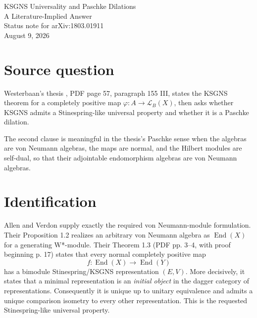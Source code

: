 \documentclass[10pt]{article}
\begin{document}
\begin{center}
{\LARGE KSGNS Universality and Paschke Dilations}\\[0.25em]
{\Large A Literature-Implied Answer}\\[0.55em]
{\large Status note for arXiv:1803.01911}\\[0.25em]
August 9, 2026
\end{center}

\begin{center}
\end{center}

\section*{Source question}

Westerbaan's thesis \cite{Westerbaan2019}, PDF page 57, paragraph 155 III,
states the KSGNS theorem for a completely positive map
\(\varphi\colon A\to\mathcal L_B(X)\), then asks whether KSGNS admits a
Stinespring-like universal property and whether it is a Paschke dilation.

The second clause is meaningful in the thesis's Paschke sense when the
algebras are von Neumann algebras, the maps are normal, and the Hilbert
modules are self-dual, so that their adjointable endomorphism algebras are von
Neumann algebras.

\section*{Identification}

Allen and Verdon \cite{AllenVerdon2024} supply exactly the required
von Neumann-module formulation. Their Proposition 1.2 realizes an arbitrary
von Neumann algebra as \(\operatorname{End}(X)\) for a generating
W*-module. Their Theorem 1.3 (PDF pp. 3--4, with proof beginning p. 17)
states that every normal completely positive map
\[
 f\colon \operatorname{End}(X)\longrightarrow\operatorname{End}(Y)
\]
has a bimodule Stinespring/KSGNS representation \((E,V)\). More decisively,
it states that a minimal representation is an \emph{initial object} in the
dagger category of representations. Consequently it is unique up to unitary
equivalence and admits a unique comparison isometry to every other
representation. This is the requested Stinespring-like universal property.
\end{document}
